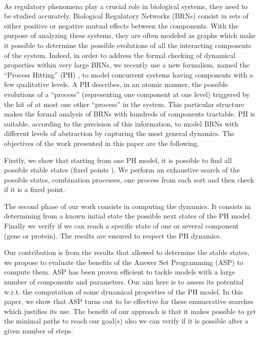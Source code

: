  \\
As regulatory phenomena play a crucial role in biological systems, they need to
be studied accurately. Biological Regulatory Networks (BRNs) consist in sets
of either positive or negative mutual effects between the components. With the
purpose of analyzing these systems, they are often modeled as graphs which make
it possible to determine the possible evolutions of all the interacting components of the system. Indeed, in order to address the formal checking of dynamical properties within very large BRNs, we recently use a new formalism, named the “Process Hitting” (PH) \cite{pauleve2011modelisation}, to model concurrent systems having components with a few qualitative levels. A PH describes, in an atomic manner, the possible evolutions of a “process” (representing one component at one level) triggered by the hit of at most one other “process” in the system. This particular structure makes the formal analysis of BRNs with hundreds of components tractable. PH is suitable, according to the precision of this information, to model BRNs with different levels of abstraction by capturing the most general dynamics.
The objectives of the work presented in this paper are the following. 

Firstly, we show that starting from one PH model, it is possible to find all possible stable states (fixed points \cite{wuensche1998genomic}).
We perform an exhaustive search of the possible states, combination processes, one process from each sort and then check if it is a fixed point.

The second phase of our work consists in computing the dynamics. It consists in determining from a known initial state the possible next states of the PH model. Finally we verify if we can reach a specific state of one or several component (gene or protein). The results are ensured to respect the PH dynamics.

Our contribution is from the results that allowed to determine the stable states, we propose to evaluate the benefits of the Answer Set Programming (ASP) \cite{baral2003knowledge} to compute them. ASP has been proven efficient to tackle models with a large number of components and parameters. Our aim here is to assess its potential w.r.t. the computation of some dynamical properties of the PH model. In this paper, we show that ASP turns out to be effective for these enumerative searches which justifies its use. The benefit of our approach is that it makes possible to get the minimal paths to reach our goal(s) also we can verify if it is possible after a given number of steps. %